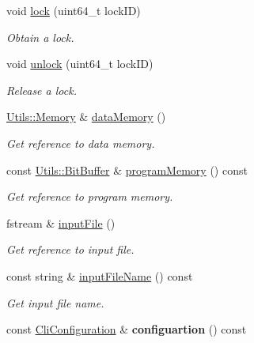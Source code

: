 \begin{DoxyCompactItemize}
void \mbox{\hyperlink{struct_evm_1_1_application_a102467a47420ec04d5ab1e68bd465579}{lock}} (uint64\+\_\+t lock\+ID)
\begin{DoxyCompactList}\small\item\em Obtain a lock. \end{DoxyCompactList}\item 
void \mbox{\hyperlink{struct_evm_1_1_application_a1f1efb23d8d815d3b92b9a2f85b328f1}{unlock}} (uint64\+\_\+t lock\+ID)
\begin{DoxyCompactList}\small\item\em Release a lock. \end{DoxyCompactList}\item 
\mbox{\hyperlink{struct_evm_1_1_utils_1_1_memory}{Utils\+::\+Memory}} \& \mbox{\hyperlink{struct_evm_1_1_application_ae298c9f84fb6a0a4d51aa6ca39dce96a}{data\+Memory}} ()
\begin{DoxyCompactList}\small\item\em Get reference to data memory. \end{DoxyCompactList}\item 
const \mbox{\hyperlink{struct_evm_1_1_utils_1_1_bit_buffer}{Utils\+::\+Bit\+Buffer}} \& \mbox{\hyperlink{struct_evm_1_1_application_a0e55226ef456356c5d25f8da1c9ae926}{program\+Memory}} () const
\begin{DoxyCompactList}\small\item\em Get reference to program memory. \end{DoxyCompactList}\item 
fstream \& \mbox{\hyperlink{struct_evm_1_1_application_a9cb5d822b96435dd1e48f02e3a14e66a}{input\+File}} ()
\begin{DoxyCompactList}\small\item\em Get reference to input file. \end{DoxyCompactList}\item 
const string \& \mbox{\hyperlink{struct_evm_1_1_application_ac7916137b6e8cb5ae323e1ec9ce9f050}{input\+File\+Name}} () const
\begin{DoxyCompactList}\small\item\em Get input file name. \end{DoxyCompactList}\item 
\mbox{\label{struct_evm_1_1_application_a4baabf3c0d1eeef319952726eed7f8a1}} 
const \mbox{\hyperlink{struct_evm_1_1_cli_configuration}{Cli\+Configuration}} \& {\bfseries configuartion} () const
\item 

\end{DoxyCompactItemize}
